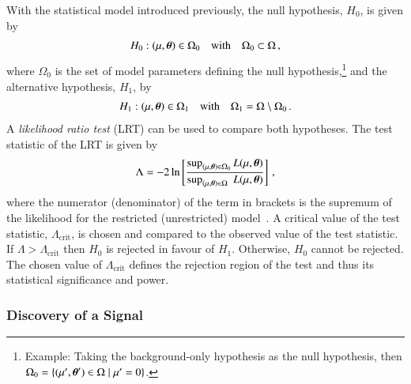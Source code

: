 With the statistical model introduced previously, the null hypothesis, $H_0$, is
given by
\begin{align*}
  H_0: (\mu, \myvec{\theta}) \in \Omega_0
  \quad \text{with} \quad \Omega_0 \subset \Omega \,\text{,}
\end{align*}
where $\Omega_0$ is the set of model parameters defining the null
hypothesis,\footnote{Example: Taking the background-only hypothesis as the null
  hypothesis, then
  $\Omega_0 = \{ (\mu^\prime, \myvec{\theta}^\prime) \in \Omega \mid \mu^\prime
  = 0 \}$.}  and the alternative hypothesis, $H_1$, by
\begin{align*}
  H_1: (\mu, \myvec{\theta}) \in \Omega_1
  \quad \text{with} \quad \Omega_1 = \Omega \setminus \Omega_0 \,\text{.}
\end{align*}
A \emph{likelihood ratio test} (LRT) can be used to compare both hypotheses. The
test statistic of the LRT is given by
\begin{align*}
  \Lambda = -2 \ln \left[
  \frac{\sup_{(\mu, \myvec{\theta}) \in \Omega_0} L(\mu, \myvec{\theta})}
  {\sup_{(\mu, \myvec{\theta}) \in \Omega\phantom{_0}} L(\mu, \myvec{\theta})}
  \right] \,\text{,}
\end{align*}
where the numerator (denominator) of the term in brackets is the supremum of the
likelihood for the restricted (unrestricted) model~\cite{casella2001}. A
critical value of the test statistic, $\Lambda_{\text{crit}}$, is chosen and
compared to the observed value of the test statistic. If
$\Lambda > \Lambda_{\text{crit}}$ then $H_0$ is rejected in favour of
$H_1$. Otherwise, $H_0$ cannot be rejected. The chosen value of
$\Lambda_{\text{crit}}$ defines the rejection region of the test and thus its
statistical significance and power.


\subsubsection{Discovery of a Signal}

